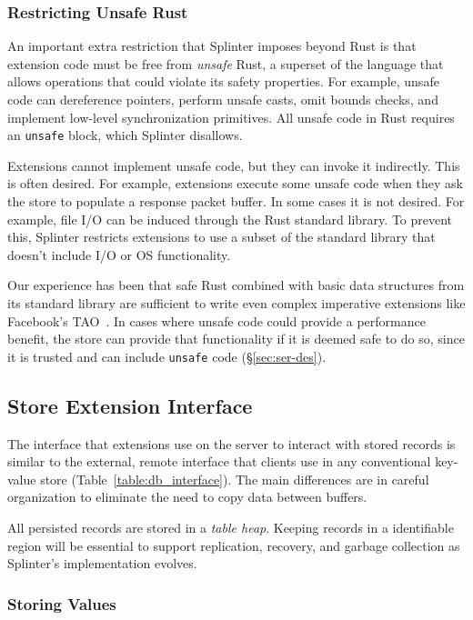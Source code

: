 \subsubsection{Restricting Unsafe Rust}
\label{sec:unsafe}

An important extra restriction that Splinter imposes beyond Rust is that
  extension code must be free from \emph{unsafe} Rust, a superset of the
  language that allows
  operations that could violate its safety properties.
For example, unsafe code can dereference pointers, perform unsafe casts, omit
  bounds checks, and implement low-level synchronization primitives.
All unsafe code in Rust requires an \texttt{unsafe} block, which
Splinter disallows.

Extensions cannot implement unsafe code, but they can invoke it indirectly.
This is often desired.
For example, extensions execute some unsafe code when they ask the store to
  populate a response packet buffer.
In some cases it is not desired.
For example, file I/O can be induced through the Rust standard
  library.
To prevent this, Splinter restricts extensions to use a subset of the standard
  library that doesn't include I/O or OS functionality.

Our experience has been that safe Rust combined with basic data structures from
  its standard library are sufficient to write even complex imperative extensions
  like Facebook's TAO~\cite{tao-2013}.
In cases where unsafe code could provide a performance benefit, the store can
  provide that functionality if it is deemed safe to do so, since it is trusted
  and can include \texttt{unsafe} code (\S\ref{sec:ser-des}).

\subsection{Store Extension Interface}
\label{sec:db-iface}

The interface that extensions use on the server to interact with stored records is similar to
  the external, remote interface that clients use in any conventional key-value
  store (Table~\ref{table:db_interface}).
The main differences are in careful organization to eliminate the need to copy
  data between buffers.

All persisted records are stored in a \emph{table heap}.
Keeping records in a identifiable region will be essential to support
  replication, recovery, and garbage collection as Splinter's implementation
  evolves.

\subsubsection{Storing Values}

